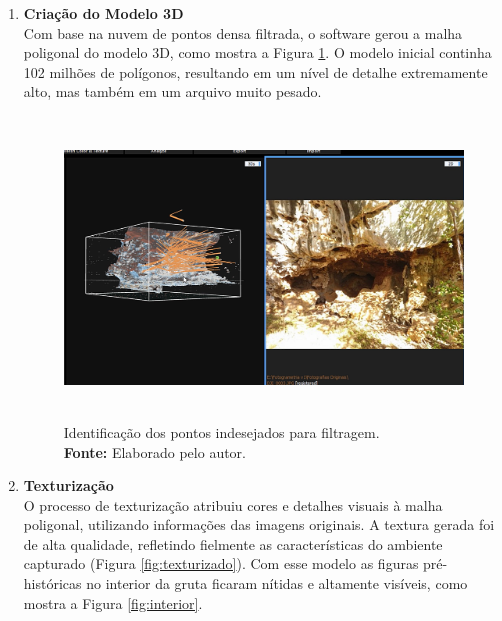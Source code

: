\begin{enumerate}
\item \textbf{Criação do Modelo 3D} \\
Com base na nuvem de pontos densa filtrada, o software gerou a malha poligonal do modelo 3D, como mostra a Figura \ref{fig:modelo 3D solido}. O modelo inicial continha 102 milhões de polígonos, resultando em um nível de detalhe extremamente alto, mas também em um arquivo muito pesado.
\begin{figure}[H]
        \centering
        \includegraphics[height=8cm, keepaspectratio]{img/reality e fotogrametria processo/modelo solido e foto.png}
        \caption{Identificação dos pontos indesejados para filtragem. \\
            \textbf{Fonte:} Elaborado pelo autor.}
        \label{fig:modelo 3D solido}
\end{figure}

\item \textbf{Texturização} \\
O processo de texturização atribuiu cores e detalhes visuais à malha poligonal, utilizando informações das imagens originais. A textura gerada foi de alta qualidade, refletindo fielmente as características do ambiente capturado (Figura \ref{fig:texturizado}). Com esse modelo as figuras pré-históricas no interior da gruta ficaram nítidas e altamente visíveis, como mostra a Figura \ref{fig:interior}.


\end{enumerate}
